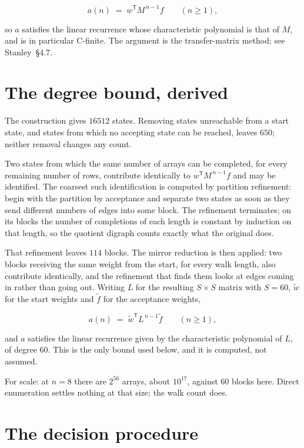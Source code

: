 \documentclass[11pt]{article}
\theoremstyle{definition}
\begin{document}
\[a(n) \;=\; w^{\mathsf T} M^{\,n-1} f \qquad (n \ge 1),\]

so $a$ satisfies the linear recurrence whose characteristic polynomial is that of $M$, and is in particular C-finite. The argument is the transfer-matrix method; see Stanley~\S4.7.

\section{The degree bound, derived}

The construction gives $16512$ states. Removing states unreachable from a start state, and states from which no accepting state can be reached, leaves $650$; neither removal changes any count.

Two states from which the same number of arrays can be completed, for every remaining number of rows, contribute identically to $w^{\mathsf T}M^{\,n-1}f$ and may be identified. The coarsest such identification is computed by partition refinement: begin with the partition by acceptance and separate two states as soon as they send different numbers of edges into some block. The refinement terminates; on its blocks the number of completions of each length is constant by induction on that length, so the quotient digraph counts exactly what the original does.

That refinement leaves $114$ blocks. The mirror reduction is then applied: two blocks receiving the same weight from the start, for every walk length, also contribute identically, and the refinement that finds them looks at edges coming in rather than going out. Writing $L$ for the resulting $S \times S$ matrix with $S = 60$, $\tilde w$ for the start weights and $\tilde f$ for the acceptance weights,

\[a(n) \;=\; \tilde w^{\mathsf T} L^{\,n-1} \tilde f \qquad (n \ge 1),\]

and $a$ satisfies the linear recurrence given by the characteristic polynomial of $L$, of degree $60$. This is the only bound used below, and it is computed, not assumed.

For scale: at $n = 8$ there are $2^{56}$ arrays, about $10^{17}$, against $60$ blocks here. Direct enumeration settles nothing at that size; the walk count does.

\section{The decision procedure}
\end{document}

